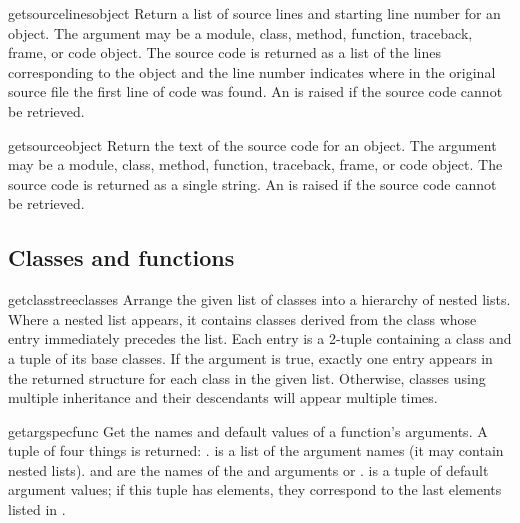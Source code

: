 \begin{funcdesc}{getsourcelines}{object}
  Return a list of source lines and starting line number for an object.
  The argument may be a module, class, method, function, traceback, frame,
  or code object.  The source code is returned as a list of the lines
  corresponding to the object and the line number indicates where in the
  original source file the first line of code was found.  An
   is raised if the source code cannot be retrieved.
\end{funcdesc}

\begin{funcdesc}{getsource}{object}
  Return the text of the source code for an object.
  The argument may be a module, class, method, function, traceback, frame,
  or code object.  The source code is returned as a single string.  An
   is raised if the source code cannot be retrieved.
\end{funcdesc}

\subsection{Classes and functions
            \label{inspect-classes-functions}}

\begin{funcdesc}{getclasstree}{classes}
  Arrange the given list of classes into a hierarchy of nested lists.
  Where a nested list appears, it contains classes derived from the class
  whose entry immediately precedes the list.  Each entry is a 2-tuple
  containing a class and a tuple of its base classes.  If the 
  argument is true, exactly one entry appears in the returned structure
  for each class in the given list.  Otherwise, classes using multiple
  inheritance and their descendants will appear multiple times.
\end{funcdesc}

\begin{funcdesc}{getargspec}{func}
  Get the names and default values of a function's arguments.
  A tuple of four things is returned: .
   is a list of the argument names (it may contain nested lists).
   and  are the names of the \code{*} and
  \code{**} arguments or .
   is a tuple of default argument values; if this tuple
  has  elements, they correspond to the last  elements
  listed in .
\end{funcdesc}

